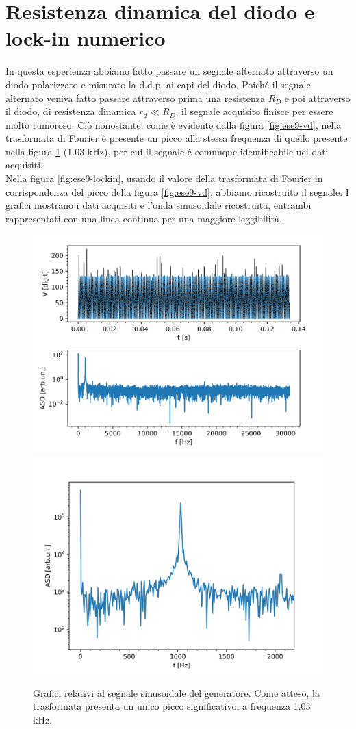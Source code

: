 \documentclass{article}[a4paper, oneside,11pt]
\begin{document}
\section{Resistenza dinamica del diodo e lock-in numerico}
In questa esperienza abbiamo fatto passare un segnale alternato attraverso un diodo polarizzato e misurato la d.d.p. ai capi del diodo. Poiché il segnale alternato veniva fatto passare attraverso prima una resistenza $R_D$ e poi attraverso il diodo, di resistenza dinamica $r_d \ll R_D$, il segnale acquisito finisce per essere molto rumoroso. Ciò nonostante, come è evidente dalla figura \ref{fig:ese9-vd}, nella trasformata di Fourier è presente un picco alla stessa frequenza di quello presente nella figura \ref{fig:ese9-VG} (1.03 kHz), per cui il segnale è comunque identificabile nei dati acquisiti.\\
Nella figura \ref{fig:ese9-lockin}, usando il valore della trasformata di Fourier in corrispondenza del picco della figura \ref{fig:ese9-vd}, abbiamo ricostruito il segnale. I grafici mostrano i dati acquisiti e l'onda sinusoidale ricostruita, entrambi rappresentati con una linea continua per una maggiore leggibilità. 

\begin{figure}[H]
    \centering
    \includegraphics[width=0.45\columnwidth]{img/ese9/dataEDJ-VG-1.75V.png}
    \includegraphics[width=0.48\columnwidth]{img/ese9/dataEDJ-VG-1.75V-tagl.png}
    \caption{Grafici relativi al segnale sinusoidale del generatore. Come atteso, la trasformata presenta un unico picco significativo, a frequenza 1.03 kHz.}
    \label{fig:ese9-VG}
\end{figure}
\end{document}
